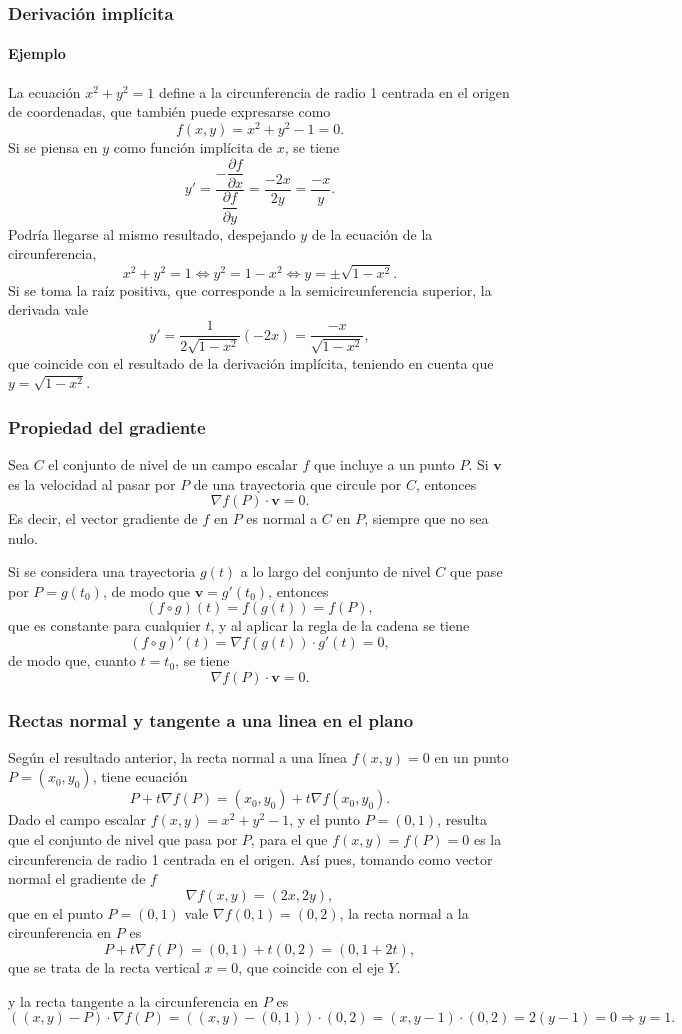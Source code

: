 \begin{frame}
\frametitle{Derivación implícita}
\framesubtitle{Ejemplo}
La ecuación $x^2+y^2=1$ define a la circunferencia de radio 1 centrada en el origen de coordenadas, que también puede expresarse como
\[
f(x,y) = x^2+y^2-1 = 0.
\]
Si se piensa en $y$ como función implícita de $x$, se tiene 
\[
y'=\frac{-\dfrac{\partial f}{\partial x}}{\dfrac{\partial f}{\partial y}} = \frac{-2x}{2y}=\frac{-x}{y}.
\]
Podría llegarse al mismo resultado, despejando $y$ de la ecuación de la circunferencia, 
\[
x^2+y^2=1 \Leftrightarrow y^2=1-x^2 \Leftrightarrow y= \pm\sqrt{1-x^2}.
\]
Si se toma la raíz positiva, que corresponde a la semicircunferencia superior, la derivada vale
\[
y' = \frac{1}{2\sqrt{1-x^2}}(-2x) = \frac{-x}{\sqrt{1-x^2}}, 
\]
que coincide con el resultado de la derivación implícita, teniendo en cuenta que $y=\sqrt{1-x^2}$.
\end{frame}


\begin{frame}
\frametitle{Propiedad del gradiente}
\begin{teorema}
Sea $C$ el conjunto de nivel de un campo escalar $f$ que incluye a un punto $P$. 
Si $\mathbf{v}$ es la velocidad al pasar por $P$ de una trayectoria que circule por $C$, entonces
\[
\nabla f(P) \cdot \mathbf{v} = 0.
\] 
Es decir, el vector gradiente de $f$ en $P$ es normal a $C$ en $P$, siempre que no sea nulo.
\end{teorema}
Si se considera una trayectoria $g(t)$ a lo largo del conjunto de nivel $C$ que pase por $P=g(t_0)$, de modo que $\mathbf{v}=g'(t_0)$, entonces 
\[
(f\circ g)(t) = f(g(t)) = f(P),
\]
que es constante para cualquier $t$, y al aplicar la regla de la cadena se tiene
\[
(f\circ g)'(t) = \nabla f(g(t))\cdot  g'(t) = 0,
\]
de modo que, cuanto $t=t_0$, se tiene 
\[
\nabla f(P)\cdot \mathbf{v} = 0.
\]
\end{frame}


\begin{frame}
\frametitle{Rectas normal y tangente a una linea en el plano}
Según el resultado anterior, la recta normal a una línea $f(x,y)=0$ en un punto $P=(x_0,y_0)$, tiene ecuación
\[
P+t\nabla f(P) = (x_0,y_0)+t\nabla f(x_0,y_0).
\]
Dado el campo escalar $f(x,y)=x^2+y^2-1$, y el punto $P=(0,1)$, resulta que el conjunto de nivel que pasa por $P$, para el que $f(x,y)=f(P)=0$ es la circunferencia de radio 1 centrada en el origen.
Así pues, tomando como vector normal el gradiente de $f$
\[
\nabla f(x,y) = (2x,2y),
\] 
que en el punto $P=(0,1)$ vale $\nabla f(0,1) = (0,2)$, la recta normal a la circunferencia en $P$ es
\[
P+t\nabla f(P) = (0,1)+t(0,2) = (0,1+2t),
\]
que se trata de la recta vertical $x=0$, que coincide con el eje $Y$.

y la recta tangente a la circunferencia en $P$ es
\[
((x,y)-P)\cdot \nabla f(P) = ((x,y)-(0,1))\cdot (0,2) = (x,y-1)\cdot(0,2) = 2(y-1) = 0 \Rightarrow y=1. 
\]
\end{frame}


